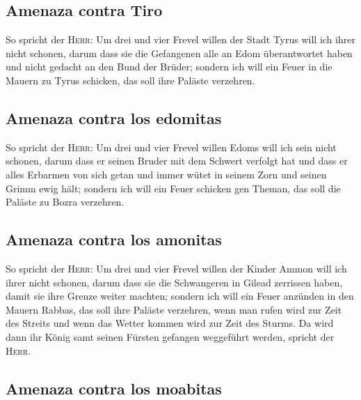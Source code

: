 \hypertarget{amenaza-contra-tiro}{%
\subsection{Amenaza contra Tiro}\label{amenaza-contra-tiro}}

 So spricht der \textsc{Herr}: Um drei und vier Frevel
willen der Stadt Tyrus will ich ihrer nicht schonen, darum dass sie die
Gefangenen alle an Edom überantwortet haben und nicht gedacht an den
Bund der Brüder;  sondern ich will ein Feuer in die
Mauern zu Tyrus schicken, das soll ihre Paläste verzehren.

\hypertarget{amenaza-contra-los-edomitas}{%
\subsection{Amenaza contra los
edomitas}\label{amenaza-contra-los-edomitas}}

 So spricht der \textsc{Herr}: Um drei und vier Frevel
willen Edoms will ich sein nicht schonen, darum dass er seinen Bruder
mit dem Schwert verfolgt hat und dass er alles Erbarmen von sich getan
und immer wütet in seinem Zorn und seinen Grimm ewig hält;
 sondern ich will ein Feuer schicken gen Theman, das soll
die Paläste zu Bozra verzehren.

\hypertarget{amenaza-contra-los-amonitas}{%
\subsection{Amenaza contra los
amonitas}\label{amenaza-contra-los-amonitas}}

 So spricht der \textsc{Herr}: Um drei und vier Frevel
willen der Kinder Ammon will ich ihrer nicht schonen, darum dass sie die
Schwangeren in Gilead zerrissen haben, damit sie ihre Grenze weiter
machten;  sondern ich will ein Feuer anzünden in den
Mauern Rabbas, das soll ihre Paläste verzehren, wenn man rufen wird zur
Zeit des Streits und wenn das Wetter kommen wird zur Zeit des Sturms.
 Da wird dann ihr König samt seinen Fürsten gefangen
weggeführt werden, spricht der \textsc{Herr}.

\hypertarget{amenaza-contra-los-moabitas}{%
\subsection{Amenaza contra los
moabitas}\label{amenaza-contra-los-moabitas}}


